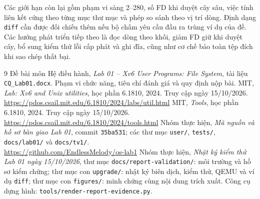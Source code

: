 \documentclass[12pt,a4paper]{article}
\newcommand{\code}[1]{\texttt{#1}}
\begin{document}
Các giới hạn còn lại gồm phạm vi sàng 2--280, số FD khi duyệt cây sâu, việc tính liên kết cứng theo từng mục thư mục và phép so sánh theo vị trí dòng. Định dạng \code{diff} cần được đối chiếu thêm nếu bộ chấm yêu cầu đầu ra trùng ví dụ của đề. Các hướng phát triển tiếp theo là đọc dòng theo khối, giảm FD giữ khi duyệt cây, bổ sung kiểm thử lỗi cấp phát và ghi đĩa, cũng như cơ chế bảo toàn tệp đích khi sao chép thất bại.

\clearpage
{}
{}
\begingroup\small\raggedright
\begin{thebibliography}{9}
\setlength{\itemsep}{7pt}
 Đề bài môn Hệ điều hành, \emph{Lab 01 -- Xv6 User Programs: File System}, tài liệu \code{CQ\_Lab01.docx}. Phạm vi chức năng, tiêu chí đánh giá và quy định nộp bài.
 MIT, \emph{Lab: Xv6 and Unix utilities}, học phần 6.1810, 2024. Truy cập ngày 15/10/2026.\\
\url{https://pdos.csail.mit.edu/6.1810/2024/labs/util.html}
 MIT, \emph{Tools}, học phần 6.1810, 2024. Truy cập ngày 15/10/2026.\\
\url{https://pdos.csail.mit.edu/6.1810/2024/tools.html}
 Nhóm thực hiện, \emph{Mã nguồn và hồ sơ bàn giao Lab 01}, commit \code{35ba531}; các thư mục \code{user/}, \code{tests/}, \code{docs/lab01/} và \code{docs/tv1/}.\\
\url{https://github.com/EndlessMelody/os-lab1}
 Nhóm thực hiện, \emph{Nhật ký kiểm thử Lab 01 ngày 15/10/2026}, thư mục \code{docs/report-validation/}: môi trường và hồ sơ kiểm chứng; thư mục con \code{upgrade/}: nhật ký biên dịch, kiểm thử, QEMU và ví dụ \code{diff}; thư mục con \code{figures/}: minh chứng cùng nội dung trích xuất. Công cụ dựng hình: \code{tools/render-report-evidence.py}.
\end{thebibliography}
\endgroup
\end{document}
